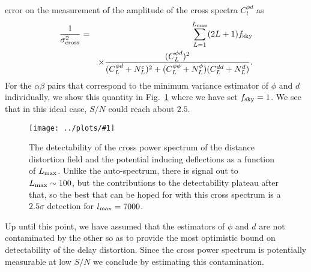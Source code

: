 \documentclass[prd,amsmath,amssymb,floatfix,superscriptaddress,nofootinbib,twocolumn]{revtex4-1}
\def\bea{\begin{eqnarray}}
\def\eea{\end{eqnarray}}
\newcommand{\eql}[1]{\label{eq:#1}}
\newcommand{\sfig}[2]{
\texttt{[image: ../plots/\#1]}
        }
\newcommand{\Sfig}[2]{
   \begin{figure}[thbp]
   \begin{center}
    \sfig{#1.pdf}{\columnwidth}
    \caption{{\small #2}}
    \label{fig:#1}
     \end{center}
   \end{figure}
}
\newcommand{\rf}[1]{\ref{fig:#1}}
\begin{document}
error on the measurement of the amplitude of the cross spectra $C_l^{\phi d}$ as
\bea
\eql{sn1}
\frac{1}{\sigma_{\rm cross}^{2} }&=& \sum_{L=1}^{L_{\rm max}}(2L+1)f_{\rm sky} \\
&&\times\frac{(C_L^{\phi d})^2}{( C_L^{\phi d}+N_{L}^{c})^2+
(C_L^{\phi\phi}+N_L^{\phi})(C_L^{dd}+N_L^{d})}. \nonumber
\eea
For the $\alpha\beta$ pairs that correspond to the minimum variance estimator of
$\phi$ and $d$ individually, we show this quantity in Fig.~\rf{CrossStoN} where we have set
 $f_{\rm sky}=1$. We  see that in this ideal case, $S/N$ could reach about $2.5$. 
 \Sfig{CrossStoN}{The detectability of the cross power spectrum of the distance distortion field and the potential inducing deflections as a function of $L_{\rm max}$. Unlike the auto-spectrum, there is signal out to $L_{\rm max}\sim 100$, but the contributions to the detectability plateau after that, so the best that can be hoped for with this cross spectrum is a $2.5\sigma$ detection
 for $l_{\rm max}=7000$.}
 
Up until this point, we have assumed that the estimators of $\phi$ and $d$ are not 
 contaminated by the other so as to provide the most optimistic bound on detectability of the
 delay distortion.   Since the cross power spectrum is potentially measurable at low $S/N$ we
 conclude by estimating this contamination.
 
\end{document}
